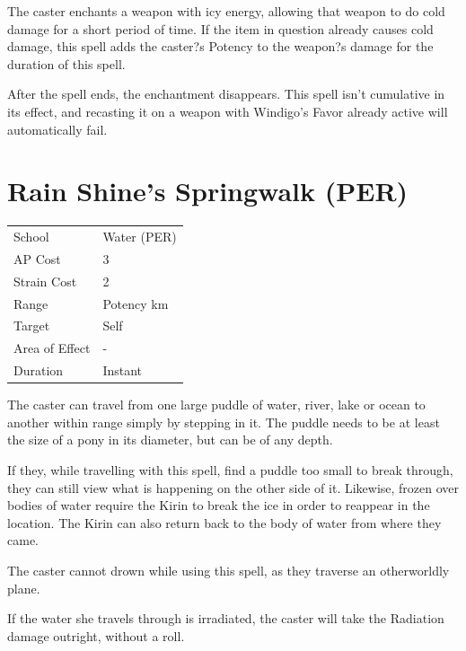 \documentclass[11pt,a4paper,twocolumn]{book}
\begin{document}
	\medskip
	
	The caster enchants a weapon with icy energy, allowing that weapon to do cold damage for a short period of time. If the item in question already causes cold damage, this spell adds the caster?s Potency to the weapon?s damage for the duration of this spell.
	
	After the spell ends, the enchantment disappears. This spell isn't cumulative in its effect, and recasting it on a weapon with Windigo's Favor already active will automatically fail.
	
						\section*{Rain Shine's Springwalk (PER)}
	{
		\begin{tabu} to 75mm{| X[l,4] | X[l,7] |}
			\hline
			School 			&  Water (PER)			\\
			AP Cost	      	&  3					\\
			Strain Cost     &  2					\\
			Range     		&  Potency km			\\
			Target      	&  Self					\\
			Area of Effect  &  -	 				\\
			Duration     	&  Instant				\\ \hline
		\end{tabu}
		
	}
	
	\medskip
	
	The caster can travel from one large puddle of water, river, lake or ocean to another within range simply by stepping in it. The puddle needs to be at least the size of a pony in its diameter, but can be of any depth. 
	
	If they, while travelling with this spell, find a puddle too small to break through, they can still view what is happening on the other side of it. Likewise, frozen over bodies of water require the Kirin to break the ice in order to reappear in the location. The Kirin can also return back to the body of water from where they came.
	
	The caster cannot drown while using this spell, as they traverse an otherworldly plane.
	
	If the water she travels through is irradiated, the caster will take the Radiation damage outright, without a roll.
	
\end{document}
